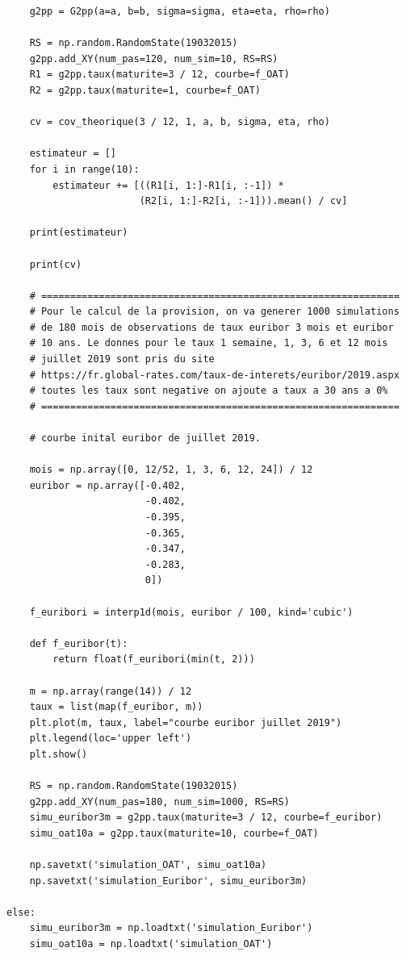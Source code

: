 \documentclass[12pt, a4paper]{book}
\begin{document}
{\begin{small}
\begin{verbatim}
    g2pp = G2pp(a=a, b=b, sigma=sigma, eta=eta, rho=rho)

    RS = np.random.RandomState(19032015)
    g2pp.add_XY(num_pas=120, num_sim=10, RS=RS)
    R1 = g2pp.taux(maturite=3 / 12, courbe=f_OAT)
    R2 = g2pp.taux(maturite=1, courbe=f_OAT)

    cv = cov_theorique(3 / 12, 1, a, b, sigma, eta, rho)

    estimateur = []
    for i in range(10):
        estimateur += [((R1[i, 1:]-R1[i, :-1]) *
                       (R2[i, 1:]-R2[i, :-1])).mean() / cv]

    print(estimateur)

    print(cv)

    # ==============================================================
    # Pour le calcul de la provision, on va generer 1000 simulations
    # de 180 mois de observations de taux euribor 3 mois et euribor
    # 10 ans. Le donnes pour le taux 1 semaine, 1, 3, 6 et 12 mois
    # juillet 2019 sont pris du site
    # https://fr.global-rates.com/taux-de-interets/euribor/2019.aspx
    # toutes les taux sont negative on ajoute a taux a 30 ans a 0%
    # ==============================================================

    # courbe inital euribor de juillet 2019.

    mois = np.array([0, 12/52, 1, 3, 6, 12, 24]) / 12
    euribor = np.array([-0.402,
                        -0.402,
                        -0.395,
                        -0.365,
                        -0.347,
                        -0.283,
                        0])

    f_euribori = interp1d(mois, euribor / 100, kind='cubic')

    def f_euribor(t):
        return float(f_euribori(min(t, 2)))

    m = np.array(range(14)) / 12
    taux = list(map(f_euribor, m))
    plt.plot(m, taux, label="courbe euribor juillet 2019")
    plt.legend(loc='upper left')
    plt.show()

    RS = np.random.RandomState(19032015)
    g2pp.add_XY(num_pas=180, num_sim=1000, RS=RS)
    simu_euribor3m = g2pp.taux(maturite=3 / 12, courbe=f_euribor)
    simu_oat10a = g2pp.taux(maturite=10, courbe=f_OAT)

    np.savetxt('simulation_OAT', simu_oat10a)
    np.savetxt('simulation_Euribor', simu_euribor3m)

else:
    simu_euribor3m = np.loadtxt('simulation_Euribor')
    simu_oat10a = np.loadtxt('simulation_OAT')



\end{verbatim}
\end{small}}
\end{document}
